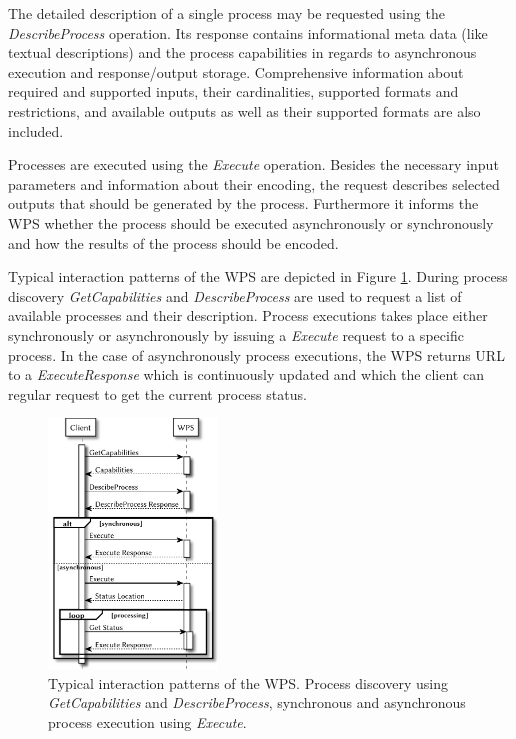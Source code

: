 	The detailed description of a single process may be requested using the \emph{DescribeProcess} operation. Its response contains informational meta data (like textual descriptions) and the process capabilities in regards to asynchronous execution and response/output storage. Comprehensive information about required and supported inputs, their cardinalities, supported formats and restrictions, and available outputs as well as their supported formats are also included.

	Processes are executed using the \emph{Execute} operation. Besides the necessary input parameters and information about their encoding, the request describes selected outputs that should be generated by the process. Furthermore it informs the \ac{WPS} whether the process should be executed asynchronously or synchronously and how the results of the process should be encoded.

	Typical interaction patterns of the \acl{WPS} are depicted in Figure \ref{fig:sd:wps}. During process discovery \emph{GetCapabilities} and \emph{DescribeProcess} are used to request a list of available processes and their description. Process executions takes place either synchronously or asynchronously by issuing a \emph{Execute} request to a specific process. In the case of asynchronously process executions, the \ac{WPS} returns URL to a \emph{ExecuteResponse} which is continuously updated and which the client can regular request to get the current process status.
	\begin{figure}[!htb]
		\centering
		\includegraphics[width=0.40140845070422537\textwidth]{figures/sequence-diagramm-wps.pdf}
		\caption{\label{fig:sd:wps} Typical interaction patterns of the \acl{WPS}. Process discovery using \emph{GetCapabilities} and \emph{DescribeProcess}, synchronous and asynchronous process execution using \emph{Execute}.}
	\end{figure}

